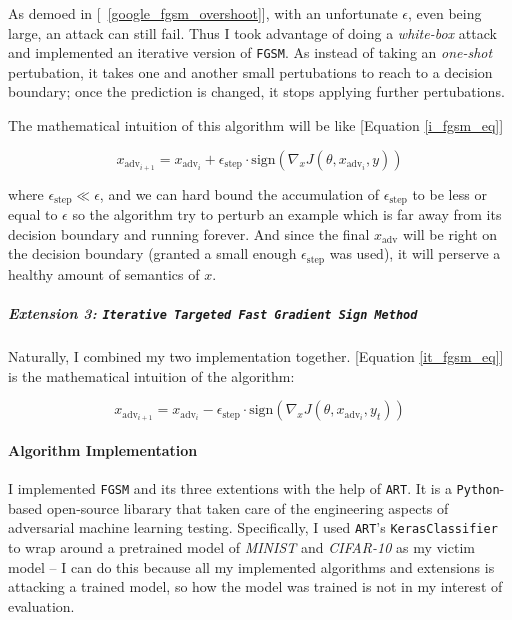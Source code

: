 \documentclass[11pt]{article}
\newcommand{\ilc}{\texttt}
\begin{document}
	As demoed in [\figurename{\ \ref{google_fgsm_overshoot}}], with an unfortunate $\epsilon$, even being large, an attack can still fail. Thus I took advantage of doing a \textit{white-box} attack and implemented an iterative version of \ilc{FGSM}. As instead of taking an \textit{one-shot} pertubation, it takes one and another small pertubations to reach to a decision boundary; once the prediction is changed, it stops applying further pertubations.
	
	The mathematical intuition of this algorithm will be like [Equation \ref{i_fgsm_eq}]
	
	\begin{equation}
	x_{\text{adv}_{i+1}} = x_{\text{adv}_{i}} + \epsilon_{\text{step}} \cdot \text{sign}(\nabla_x J(\theta, x_{\text{adv}_{i}}, y))
	\label{i_fgsm_eq}
	\end{equation}
	
	where $\epsilon_{\text{step}} \ll \epsilon$, and we can hard bound the accumulation of $\epsilon_{\text{step}}$ to be less or equal to $\epsilon$ so the algorithm try to perturb an example which is far away from its decision boundary and running forever. And since the final $x_{\text{adv}} $ will be right on the decision boundary (granted a small enough $\epsilon_{\text{step}}$ was used), it will perserve a healthy amount of semantics of $x$.
	
	\subparagraph{Extension 3: \ilc{Iterative Targeted Fast Gradient Sign Method}}
	
	Naturally, I combined my two implementation together. [Equation \ref{it_fgsm_eq}] is the mathematical intuition of the algorithm:
	
	\begin{equation}
	x_{\text{adv}_{i+1}} = x_{\text{adv}_{i}} - \epsilon_{\text{step}} \cdot \text{sign}(\nabla_x J(\theta, x_{\text{adv}_{i}}, y_t))
	\label{it_fgsm_eq}
	\end{equation}
	
	\paragraph{Algorithm Implementation}
	
	I implemented \ilc{FGSM} and its three extentions with the help of \ilc{ART}\cite{cite:art}. It is a \ilc{Python}-based open-source libarary that taken care of the engineering aspects of adversarial machine learning testing. Specifically, I used \ilc{ART}'s \ilc{KerasClassifier} to wrap around a pretrained model of \textit{MINIST} and \textit{CIFAR-10} as my victim model -- I can do this because all my implemented algorithms and extensions is attacking a trained model, so how the model was trained is not in my interest of evaluation.\newline
	
\end{document}
